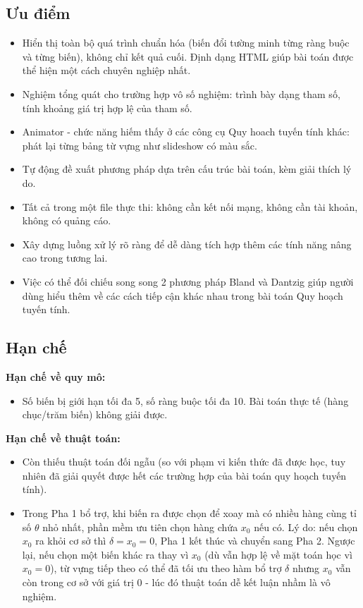 \documentclass[12pt,a4paper]{article}
\begin{document}
\subsection{Ưu điểm}
\begin{itemize}[label=\textcolor{secondary}{$\bullet$}, itemsep=1pt]
    \item Hiển thị toàn bộ quá trình chuẩn hóa (biến đổi tường minh từng ràng buộc và từng biến), không chỉ kết quả cuối. Định dạng HTML giúp bài toán được thể hiện một cách chuyên nghiệp nhất.
    \item Nghiệm tổng quát cho trường hợp vô số nghiệm: trình bày dạng tham số, tính khoảng giá trị hợp lệ của tham số.
    \item Animator - chức năng hiếm thấy ở các công cụ Quy hoach tuyến tính khác: phát lại từng bảng từ vựng như slideshow có màu sắc.
    \item Tự động đề xuất phương pháp dựa trên cấu trúc bài toán, kèm giải thích lý do.
    \item Tất cả trong một file thực thi: không cần kết nối mạng, không cần tài khoản, không có quảng cáo.
    \item Xây dựng luồng xử lý rõ ràng để dễ dàng tích hợp thêm các tính năng nâng cao trong tương lai.
    \item Việc có thể đối chiếu song song 2 phương pháp Bland và Dantzig giúp người dùng hiểu thêm về các cách tiếp cận khác nhau trong bài toán Quy hoạch tuyến tính.
\end{itemize}

\subsection{Hạn chế}
\textbf{Hạn chế về quy mô:}
\begin{itemize}[label=\textcolor{secondary}{$\bullet$}, itemsep=1pt]
    \item Số biến bị giới hạn tối đa 5, số ràng buộc tối đa 10. Bài toán thực tế (hàng chục/trăm biến) không giải được.
\end{itemize}

\medskip
\noindent\textbf{Hạn chế về thuật toán:}
\begin{itemize}[label=\textcolor{secondary}{$\bullet$}, itemsep=1pt]
    \item Còn thiếu thuật toán đối ngẫu (so với phạm vi kiến thức đã được học, tuy nhiên đã giải quyết được hết các trường hợp của bài toán quy hoạch tuyến tính).
    \item Trong Pha 1 bổ trợ, khi biến ra được chọn để xoay mà có nhiều hàng cùng tỉ số $\theta$ nhỏ nhất, phần mềm ưu tiên chọn hàng chứa $x_0$ nếu có. Lý do: nếu chọn $x_0$ ra khỏi cơ sở thì $\delta = x_0 = 0$, Pha 1 kết thúc và chuyển sang Pha 2. Ngược lại, nếu chọn một biến khác ra thay vì $x_0$ (dù vẫn hợp lệ về mặt toán học vì $x_0 = 0$), từ vựng tiếp theo có thể đã tối ưu theo hàm bổ trợ $\delta$ nhưng $x_0$ vẫn còn trong cơ sở với giá trị 0 - lúc đó thuật toán dễ kết luận nhầm là vô nghiệm.
\end{itemize}
\end{document}
